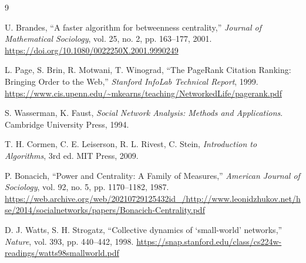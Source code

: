 \begin{thebibliography}{9}

U. Brandes,
``A faster algorithm for betweenness centrality,''
\textit{Journal of Mathematical Sociology}, vol. 25, no. 2, pp. 163--177, 2001.
\newline\url{https://doi.org/10.1080/0022250X.2001.9990249}

L. Page, S. Brin, R. Motwani, T. Winograd,
``The PageRank Citation Ranking: Bringing Order to the Web,''
\textit{Stanford InfoLab Technical Report}, 1999.
\newline\url{https://www.cis.upenn.edu/~mkearns/teaching/NetworkedLife/pagerank.pdf}

S. Wasserman, K. Faust,
\textit{Social Network Analysis: Methods and Applications}.
Cambridge University Press, 1994.

T. H. Cormen, C. E. Leiserson, R. L. Rivest, C. Stein,
\textit{Introduction to Algorithms}, 3rd ed.
MIT Press, 2009.

P. Bonacich,
``Power and Centrality: A Family of Measures,''
\textit{American Journal of Sociology}, vol. 92, no. 5, pp. 1170--1182, 1987.
\newline\url{https://web.archive.org/web/20210729125432id_/http://www.leonidzhukov.net/hse/2014/socialnetworks/papers/Bonacich-Centrality.pdf}

D. J. Watts, S. H. Strogatz,
``Collective dynamics of `small-world' networks,''
\textit{Nature}, vol. 393, pp. 440--442, 1998.
\newline\url{https://snap.stanford.edu/class/cs224w-readings/watts98smallworld.pdf}

\end{thebibliography}
